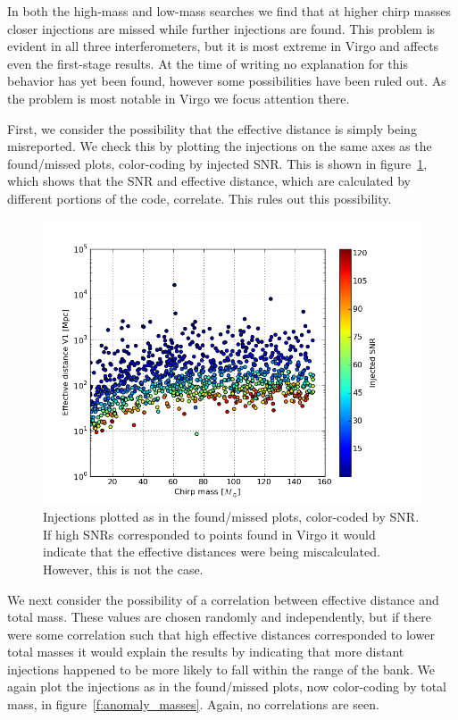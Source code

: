 In both the high-mass and low-mass searches we find that at higher
chirp masses closer injections are missed while further injections are
found.  This problem is evident in all three interferometers, but it
is most extreme in Virgo and affects even the first-stage results.  At
the time of writing no explanation for this behavior has yet been
found, however some possibilities have been ruled out.  As the problem
is most notable in Virgo we focus attention there.

First, we consider the possibility that the effective distance is
simply being misreported.  We check this by plotting the injections on
the same axes as the found/missed plots, color-coding by injected SNR.
This is shown in figure~\ref{f:anomaly_snrs}, which shows that the SNR
and effective distance, which are calculated by different portions of
the code, correlate.  This rules out this possibility.

\begin{figure}
  \includegraphics[width=\linewidth]{figures/ninja2_results/anomaly_snrs}
  \caption[Injections color-coded by SNR]{
  \label{f:anomaly_snrs}
Injections plotted as in the found/missed plots, color-coded by SNR.
If high SNRs corresponded to points found in Virgo it would indicate
that the effective distances were being miscalculated.  However, this
is not the case.
}
\end{figure}%

We next consider the possibility of a correlation between effective
distance and total mass.  These values are chosen randomly and
independently, but if there were some correlation such that high
effective distances corresponded to lower total masses it would
explain the results by indicating that more distant injections
happened to be more likely to fall within the range of the bank.
We again plot the injections as in the found/missed plots, now
color-coding by total mass, in figure~\ref{f:anomaly_masses}.  Again,
no correlations are seen.


